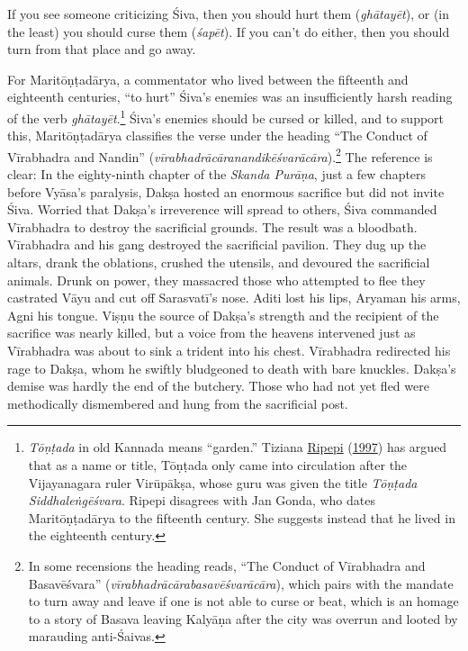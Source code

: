 \begin{pullquote}\raggedright
      If you see someone criticizing Śiva, then you should hurt them (\emph{ghātayēt}), or (in the least) you should curse them (\emph{śapēt}). If you can’t do either, then you should turn from that place and go away.\footnotemark{}

\end{pullquote}

For Maritōṇṭadārya, a commentator who lived between the fifteenth and eighteenth centuries, “to hurt” Śiva’s enemies was an insufficiently harsh reading of the verb \emph{ghātayēt}.\footnote{%
\emph{Tōṇṭada} in old Kannada means “garden.” Tiziana \hyperref[Ripepi1997]{Ripepi} (\hyperref[Ripepi1997]{1997}) has argued that as a name or title, Tōṇṭada only came into circulation after the Vijayanagara ruler Virūpākṣa, whose guru was given the title \emph{Tōṇṭada Siddhaleṅgēśvara}. Ripepi disagrees with Jan Gonda, who dates Maritōṇṭadārya to the fifteenth century. She suggests instead that he lived in the eighteenth century.
}
 Śiva’s enemies should be cursed or killed, and to support this, Maritōṇṭadārya classifies the verse under the heading “The Conduct of Vīrabhadra and Nandin” (\emph{vīrabhadrācāranandikēśvarācāra}).\footnote{%
In some recensions the heading reads, “The Conduct of Vīrabhadra and Basavēśvara” (\emph{vīrabhadrācārabasavēśvarācāra}), which pairs with the mandate to turn away and leave if one is not able to curse or beat, which is an homage to a story of Basava leaving Kalyāṇa after the city was overrun and looted by marauding anti-Śaivas.
}
 The reference is clear: In the eighty-ninth chapter of the \emph{{Skanda Purāṇa}}, just a few chapters before Vyāsa’s paralysis, Dakṣa hosted an enormous sacrifice but did not invite Śiva. Worried that Dakṣa’s irreverence will spread to others, Śiva commanded Vīrabhadra to destroy the sacrificial grounds. The result was a bloodbath. Vīrabhadra and his gang destroyed the sacrificial pavilion. They dug up the altars, drank the oblations, crushed the utensils, and devoured the sacrificial animals. Drunk on power, they massacred those who attempted to flee  \Dash  they castrated Vāyu and cut off Sarasvatī’s nose. Aditi lost his lips, Aryaman his arms, Agni his tongue. Viṣṇu  \Dash  the source of Dakṣa’s strength and the recipient of the sacrifice  \Dash  was nearly killed, but a voice from the heavens intervened just as Vīrabhadra was about to sink a trident into his chest. Vīrabhadra redirected his rage to Dakṣa, whom he swiftly bludgeoned to death with bare knuckles. Dakṣa’s demise was hardly the end of the butchery. Those who had not yet fled were methodically dismembered and hung from the sacrificial post.


